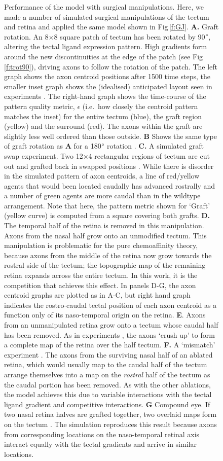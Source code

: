\documentclass[11pt, a4paper]{article}
\begin{document}
\begin{figure}
\caption{Performance of the model with surgical manipulations. Here, we made a number of simulated surgical manipulations of the tectum and retina and applied the same model shown in Fig\,\ref{f:GJ}. \textbf{A.} Graft rotation. An 8$\times$8 square patch of tectum has been rotated by 90$\degree$, altering the tectal ligand expression pattern. High gradients form around the new discontinuities at the edge of the patch (see Fig\,\ref{f:trot90}), driving axons to follow the rotation of the patch. The left graph shows the axon centroid positions after 1500 time steps, the smaller inset graph shows the (idealised) anticipated layout seen in experiments \citep{levine_deployment_1974}. The right-hand graph shows the time-course of the pattern quality metric, $\epsilon$ (i.e.~how closely the centroid pattern matches the inset) for the entire tectum (blue), the graft region (yellow) and the surround (red). The axons within the graft are slightly less well ordered than those outside. \textbf{B} Shows the same type of graft rotation as \textbf{A} for a 180$\degree$ rotation \citep{yoon_retention_1973}. \textbf{C.} A simulated graft swap experiment. Two 12$\times$4 rectangular regions of tectum are cut out and grafted back in swapped positions \citep{hope_arrow_1976,gaze_visuotectal_1983}. While there is disorder in the simulated pattern of axon centroids, a line of red/yellow agents that would been located caudally has advanced rostrally and a number of green agents are more caudal than in the wildtype arrangement. Note that here, the pattern metric shown for `Graft' (yellow curve) is computed from a square covering both grafts. \textbf{D.} The temporal half of the retina is removed in this manipulation. Axons from the nasal half grow onto an unmodified tectum. This manipulation is problematic for the pure chemoaffinity theory, because axons from the middle of the retina now grow towards the rostral side of the tectum; the topographic map of the remaining retina expands across the entire tectum. In this work, it is the competition that achieves this effect. In panels D-G, the axon centroid graphs are plotted as in A-C, but right hand graph indicates the rostro-caudal tectal position of each axon centroid as a function only of its naso-temporal origin on the retina. \textbf{E}. Axons from an unmanipulated retina grow onto a tectum whose caudal half has been removed. As in experiments \citep{yoon_reorganization_1971,finlay_orderly_1979}, the axons `crush up' to form a complete map of the retina over the half tectum. \textbf{F.} A `mismatch' experiment \citep{horder_retention_1971}. The axons from the surviving nasal half of an ablated retina, which would usually map to the caudal half of the tectum arrange themselves into a map on the \emph{rostral} half of the tectum as the caudal portion has been removed. As with the other ablations, the model achieves this due to variable interactions with the tectal ligand gradient and competitive interactions. \textbf{G} Compound eye. If two nasal retina halves are grafted together, two overlaid maps form on the tectum \citep{gaze_retino-tectal_1963}. The simulation reproduces this result because axons from corresponding locations on the naso-temporal retinal axis interact equally with the tectal gradients and arrive in similar locations.}

\end{figure}
\end{document}
